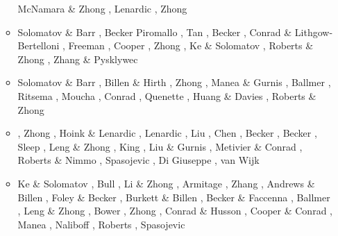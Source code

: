 \begin{itemize}
\begin{scriptsize}
\begin{itemize}
                    McNamara \& Zhong \cite{mczh05a}\cite{mczh05b},
                    Lenardic \etal \cite{lemj05}, Zhong \cite{zhon05}
\item[\twothousandsix] Solomatov \& Barr \cite{soba06}, Becker \cite{beck06}
                    Piromallo \etal \cite{pibf06}, Tan \etal \cite{tact06},
                    Becker \etal \cite{besb06}, Conrad \& Lithgow-Bertelloni \cite{coli06},
                    Freeman \etal \cite{frmm06}, Cooper \etal \cite{colm06},
                    Zhong \cite{zhon06}, Ke \& Solomatov \cite{keso06},
                    Roberts \& Zhong \cite{rozh06}, Zhang \& Pysklywec \cite{zhpy06}
\item[\twothousandseven] Solomatov \& Barr \cite{soba07}, Billen \& Hirth \cite{bihi07},
                   Zhong \etal \cite{zhzl07}, Manea \& Gurnis \cite{magu07},
                   Ballmer \etal \cite{bavi07}, Ritsema \etal \cite{rimb07},
                   Moucha \etal \cite{mofm07}, Conrad \etal \cite{cobs07},
                   Quenette \etal \cite{qums07}, Huang \& Davies \cite{huda07},
                   Roberts \& Zhong \cite{rozh07}
\item[\twothousandeight] \cite{gamc08},
                    Zhong \etal \cite{zhmt08}, Hoink \& Lenardic \cite{hole08},
                    Lenardic \etal \cite{lejm08}, Liu \etal \cite{lisg08},
                    Chen \etal \cite{chzy08}, Becker \etal \cite{beke08},
                    Becker \cite{beck08}, Sleep \cite{slee08},
                    Leng \& Zhong \cite{lezh08}, King \cite{king08},
                    Liu \& Gurnis \cite{ligu08}, Metivier \& Conrad \cite{meco08},
                    Roberts \& Nimmo \cite{roni08}, Spasojevic \etal \cite{splg08},
                    Di Giuseppe \etal \cite{divf08}, van Wijk \etal \cite{vavg08}
\item[\twothousandnine] Ke \& Solomatov \cite{keso09}, Bull \etal \cite{bumr09}, 
                    Li \& Zhong \cite{lizh09}, Armitage \etal \cite{arhm09},
                    Zhang \etal \cite{zhzm09}, Andrews \& Billen \cite{anbi09},
                    Foley \& Becker \cite{fobe09}, Burkett \& Billen \cite{bubi09},
                    Becker \& Faccenna \cite{befa09}, Ballmer \etal \cite{bavi09},
                    Leng \& Zhong \cite{lezh09}, Bower \etal \cite{bogj09},
                    Zhong \cite{zhon09}, Conrad \& Husson \cite{cohu09},
                    Cooper \& Conrad \cite{coco09}, Manea \etal \cite{maml09},
                    Naliboff \etal \cite{nacl09}, Roberts \etal \cite{rolm09},
                    Spasojevic \etal \cite{splg09}

\end{itemize}
\end{scriptsize}
\end{itemize}
